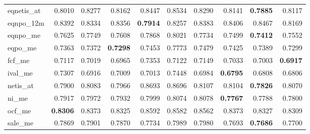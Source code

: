 \begin{longtable}{>{\raggedright\arraybackslash}p{2.6cm}rrrrrrrrr}
eqnetis\_at & 0.8010 & 0.8277 & 0.8162 & 0.8447 & 0.8534 & 0.8290 & 0.8141 & \textbf{\cellcolor{blue!10}0.7885} & 0.8117 \\
eqnpo\_12m & 0.8392 & \cellcolor{blue!10}0.8334 & \cellcolor{blue!10}0.8356 & \textbf{\cellcolor{blue!10}0.7914} & \cellcolor{blue!10}0.8257 & \cellcolor{blue!10}0.8383 & 0.8406 & 0.8467 & \cellcolor{blue!10}0.8169 \\
eqnpo\_me & 0.7625 & 0.7749 & \cellcolor{blue!10}0.7608 & 0.7868 & 0.8021 & 0.7734 & \cellcolor{blue!10}0.7499 & \textbf{\cellcolor{blue!10}0.7412} & \cellcolor{blue!10}0.7552 \\
eqpo\_me & 0.7363 & 0.7372 & \textbf{\cellcolor{blue!10}0.7298} & 0.7453 & 0.7773 & 0.7479 & 0.7425 & 0.7389 & \cellcolor{blue!10}0.7299 \\
fcf\_me & 0.7117 & \cellcolor{blue!10}0.7019 & \cellcolor{blue!10}0.6965 & 0.7353 & 0.7122 & 0.7149 & \cellcolor{blue!10}0.7033 & \cellcolor{blue!10}0.7003 & \textbf{\cellcolor{blue!10}0.6917} \\
ival\_me & 0.7307 & \cellcolor{blue!10}0.6916 & \cellcolor{blue!10}0.7009 & \cellcolor{blue!10}0.7013 & 0.7448 & \cellcolor{blue!10}0.6984 & \textbf{\cellcolor{blue!10}0.6795} & \cellcolor{blue!10}0.6808 & \cellcolor{blue!10}0.6806 \\
netis\_at & 0.7900 & 0.8083 & 0.7966 & 0.8693 & 0.8696 & 0.8107 & 0.8104 & \textbf{\cellcolor{blue!10}0.7826} & 0.8070 \\
ni\_me & 0.7917 & 0.7972 & 0.7932 & 0.7999 & 0.8074 & 0.8078 & \textbf{\cellcolor{blue!10}0.7767} & \cellcolor{blue!10}0.7788 & \cellcolor{blue!10}0.7800 \\
ocf\_me & \textbf{0.8306} & 0.8373 & 0.8325 & 0.8592 & 0.8582 & 0.8562 & 0.8373 & 0.8327 & 0.8309 \\
sale\_me & 0.7869 & 0.7901 & 0.7870 & \cellcolor{blue!10}0.7734 & 0.7989 & 0.7980 & \cellcolor{blue!10}0.7693 & \textbf{\cellcolor{blue!10}0.7686} & \cellcolor{blue!10}0.7700 \\
\hline
\end{longtable}
\endgroup
\addtocounter{table}{-1}
\begingroup\scriptsize
\captionsetup{justification=raggedright,labelsep=none,singlelinecheck=false,labelformat=boldlabel}
\setlength{\tabcolsep}{2.5pt}
